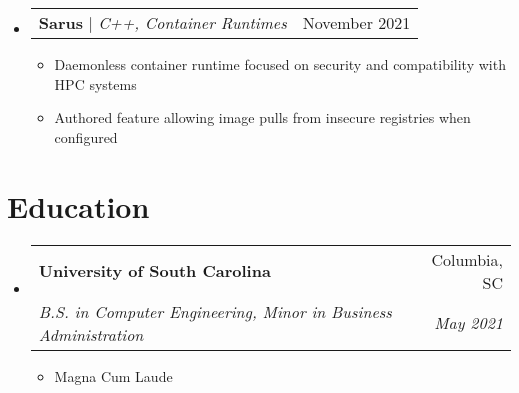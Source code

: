 \documentclass[letterpaper,11pt]{article}
\makeatletter
\newcommand{\resumeItem}[1]{
  \item\small{
    {#1 \vspace{-2pt}}
  }
}
\newcommand{\resumeSubheading}[4]{
  \vspace{-2pt}\item
    \begin{tabular*}{0.97\textwidth}[t]{l@{\extracolsep{\fill}}r}
      \textbf{#1} & #2 \\
      \textit{\small#3} & \textit{\small #4} \\
    \end{tabular*}\vspace{-7pt}
}
\newcommand{\resumeProjectHeading}[2]{
    \item
    \begin{tabular*}{0.97\textwidth}{l@{\extracolsep{\fill}}r}
      \small#1 & #2 \\
    \end{tabular*}\vspace{-7pt}
}
\newcommand{\resumeSubHeadingListStart}{\begin{itemize}[leftmargin=0.15in, label={}]}
\newcommand{\resumeSubHeadingListEnd}{\end{itemize}}
\newcommand{\resumeItemListStart}{\begin{itemize}}
\newcommand{\resumeItemListEnd}{\end{itemize}\vspace{-5pt}}
\makeatother
\begin{document}
    \resumeSubHeadingListStart
      \resumeProjectHeading
          {\textbf{Sarus} $|$ \emph{C++, Container Runtimes}}{November 2021}
          \resumeItemListStart
            \resumeItem{Daemonless container runtime focused on security and compatibility with HPC systems}
            \resumeItem{Authored feature allowing image pulls from insecure registries when configured}
          \resumeItemListEnd
    \resumeSubHeadingListEnd

\section{Education}
  \resumeSubHeadingListStart
    \resumeSubheading
      {University of South Carolina}{Columbia, SC}
      {B.S. in Computer Engineering, Minor in Business Administration}{May 2021}
          \resumeItemListStart
            \resumeItem{Magna Cum Laude}

        \resumeItemListEnd

  \resumeSubHeadingListEnd

\end{document}
